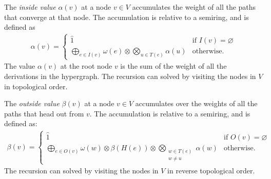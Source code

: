   \begin{definition}{} The \textit{inside value} $\alpha(v)$ at a node $v \in V$ accumulates the weight of all the paths that converge at that node. The accumulation is relative to a semiring, and is defined as
  \begin{align*}
    \alpha(v) =
      \begin{cases}
        \hat{1}  &  \mbox{if } I(v) = \varnothing  \\
        \displaystyle\bigoplus_{e \in I(v)} \omega(e) \otimes \displaystyle\bigotimes_{u \in T(e)} \alpha(u)  & \mbox{otherwise.}
      \end{cases}
  \end{align*}
  The value $\alpha(v)$ at the root node $v$ is the sum of the weight of all the derivations in the hypergraph. The recursion can solved by visiting the nodes in $V$ in topological order.
  \end{definition}

  \begin{definition}{} The \textit{outside value} $\beta(v)$ at a node $v \in V$ accumulates over the weights of all the paths that head out from $v$. The accumulation is relative to a semiring, and is defined as:
  \begin{align*}
    \beta(v) =
      \begin{cases}
        \hat{1}  & \mbox{if } O(v) = \varnothing \\
        \displaystyle\bigoplus_{e \in O(v)} \omega(w) \otimes \beta(H(e)) \otimes \displaystyle\bigotimes_{ \substack{ w \in T(e) \\ w \neq u } } \alpha(w)  & \mbox{otherwise.}
      \end{cases}
  \end{align*}
  The recursion can solved by visiting the nodes in $V$ in reverse topological order.
  \end{definition}


